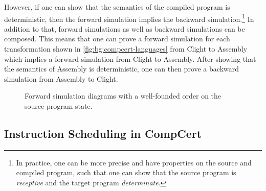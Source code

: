 However, if one can show that the semantics of the compiled program is
deterministic, then the forward simulation implies the backward
simulation.\footnote{In practice, one can be more precise and have properties on
  the source and compiled program, such that one can show that the source
  program is \emph{receptive} and the target program \emph{determinate}.}  In
addition to that, forward simulations as well as backward simulations can be
composed.  This means that one can prove a forward simulation for each
transformation shown in \cref{fig:bg:compcert-languages} from Clight to Assembly
which implies a forward simulation from Clight to Assembly.  After showing that
the semantics of Assembly is deterministic, one can then prove a backward
simulation from Assembly to Clight.

\begin{figure}
  \centering
  \begin{subfigure}[b]{0.48\linewidth}
    \centering
  \end{subfigure}\hfill%
  \begin{subfigure}[b]{0.48\linewidth}
    \centering
  \end{subfigure}
  \caption{Forward simulation diagrams with a well-founded order on the source
    program state.}%
  \label{fig:bg:forwards-simulation-diagram}
\end{figure}

\subsection{Instruction Scheduling in CompCert}%
\label{sec:bg:instruction-scheduling-compcert}

